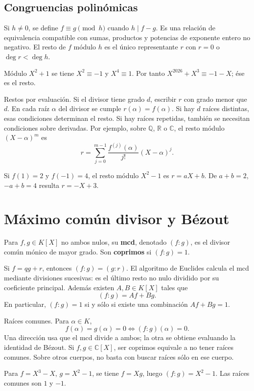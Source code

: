 \subsection{Congruencias polinómicas}
\begin{definicion}
Si $h\neq0$, se define $f\equiv g\pmod h$ cuando $h\mid f-g$.
Es una relación de equivalencia compatible con sumas, productos y
potencias de exponente entero no negativo.
El resto de $f$ módulo $h$ es el único representante $r$ con
$r=0$ o $\deg r<\deg h$.
\end{definicion}
\begin{ejemplo}
Módulo $X^2+1$ se tiene $X^2\equiv-1$ y $X^4\equiv1$.
Por tanto $X^{2026}+X^3\equiv-1-X$; ése es el resto.
\end{ejemplo}
\begin{nota}{Restos por evaluación.}
Si el divisor tiene grado $d$, escribir $r$ con grado menor que $d$.
En cada raíz $\alpha$ del divisor se cumple $r(\alpha)=f(\alpha)$.
Si hay $d$ raíces distintas, esas condiciones determinan el resto.
Si hay raíces repetidas, también se necesitan condiciones sobre derivadas.
Por ejemplo, sobre $\mathbb Q$, $\mathbb R$ o $\mathbb C$, el resto módulo
$(X-\alpha)^m$ es
\[
r=\sum_{j=0}^{m-1}\frac{f^{(j)}(\alpha)}{j!}(X-\alpha)^j.
\]
\end{nota}
\begin{ejemplo}
Si $f(1)=2$ y $f(-1)=4$, el resto módulo $X^2-1$ es $r=aX+b$.
De $a+b=2$, $-a+b=4$ resulta $r=-X+3$.
\end{ejemplo}
\section{Máximo común divisor y Bézout}
\begin{definicion}
Para $f,g\in K[X]$ no ambos nulos, su \textbf{mcd}, denotado $(f:g)$,
es el divisor común mónico de mayor grado. Son \textbf{coprimos} si $(f:g)=1$.
\end{definicion}
\begin{proposicion}
Si $f=qg+r$, entonces $(f:g)=(g:r)$.
El algoritmo de Euclides calcula el mcd mediante divisiones sucesivas:
es el último resto no nulo dividido por su coeficiente principal.
Además existen $A,B\in K[X]$ tales que
\[
(f:g)=Af+Bg.
\]
En particular, $(f:g)=1$ si y sólo si existe una combinación $Af+Bg=1$.
\end{proposicion}
\begin{nota}{Raíces comunes.}
Para $\alpha\in K$,
\[
f(\alpha)=g(\alpha)=0\iff(f:g)(\alpha)=0.
\]
Una dirección usa que el mcd divide a ambos; la otra se obtiene evaluando
la identidad de Bézout.
Si $f,g\in\mathbb C[X]$, ser coprimos equivale a no tener raíces comunes.
Sobre otros cuerpos, no basta con buscar raíces sólo en ese cuerpo.
\end{nota}
\begin{ejemplo}
Para $f=X^3-X$, $g=X^2-1$, se tiene $f=Xg$, luego $(f:g)=X^2-1$.
Las raíces comunes son $1$ y $-1$.
\end{ejemplo}
